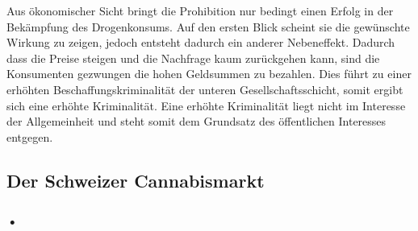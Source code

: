 \documentclass[../main.tex]{subfiles}
\begin{document}
	\noindent
	Aus ökonomischer Sicht bringt die Prohibition nur bedingt einen Erfolg in der Bekämpfung des Drogenkonsums. 
	Auf den ersten Blick scheint sie die gewünschte Wirkung zu zeigen, jedoch entsteht dadurch ein anderer Nebeneffekt. 
	Dadurch dass die Preise steigen und die Nachfrage kaum zurückgehen kann, sind die Konsumenten gezwungen die hohen Geldsummen zu bezahlen. 
	Dies führt zu einer erhöhten Beschaffungskriminalität der unteren Gesellschaftsschicht, somit ergibt sich eine erhöhte Kriminalität. 
	Eine erhöhte Kriminalität liegt nicht im Interesse der Allgemeinheit und steht somit dem Grundsatz des öffentlichen Interesses entgegen.
	
	
	\subsection{Der Schweizer Cannabismarkt}
	
	\subsubsection{•}
	 
	
\end{document}
